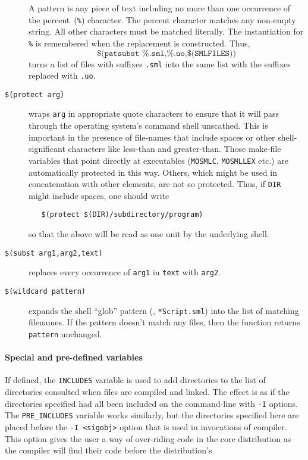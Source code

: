 \begin{description}
  A pattern is any piece of text including no more than one occurrence
  of the percent~(\texttt{\%}) character.  The percent character
  matches any non-empty string.  All other characters must be matched
  literally.  The instantiation for \texttt{\%} is remembered when the
  replacement is constructed.  Thus, \[
    \texttt{\$(patsubst \%.sml,\%.uo,\$(SMLFILES))}
   \] turns a list of files with suffixes \texttt{.sml} into the same
  list with the suffixes replaced with \texttt{.uo}.
\item[\texttt{\$(protect arg)}] wraps \texttt{arg} in appropriate
  quote characters to ensure that it will pass through the operating
  system's command shell unscathed.  This is important in the presence
  of file-names that include spaces or other shell-significant
  characters like less-than and greater-than.  Those make-file
  variables that point directly at executables (\texttt{MOSMLC},
  \texttt{MOSMLLEX} etc.) are automatically protected in this way.
  Others, which might be used in concatenation with other elements,
  are not so protected.  Thus, if \texttt{DIR} might include spaces,
  one should write
\begin{verbatim}
   $(protect $(DIR)/subdirectory/program)
\end{verbatim}
  so that the above will be read as one unit by the underlying shell.
\item[\texttt{\$(subst arg1,arg2,text)}] replaces every occurrence
  of \texttt{arg1} in \texttt{text} with \texttt{arg2}.
\item[\texttt{\$(wildcard pattern)}] expands the shell ``glob'' pattern (\eg, \texttt{*Script.sml}) into the list of matching filenames.
If the pattern doesn't match any files, then the function returns \texttt{pattern} unchanged.
\end{description}

\paragraph{Special and pre-defined variables}

If defined, the \texttt{INCLUDES} variable is used to add directories to the list of directories consulted when files are compiled and linked.
The effect is as if the directories specified had all been included on the command-line with \texttt{-I} options.
The \texttt{PRE\_INCLUDES} variable works similarly, but the directories specified here are placed before the \mbox{\texttt{-I <sigobj>}} option that is used in invocations of compiler.
This option gives the user a way of over-riding code in the core distribution as the compiler will find their code before the distribution's.

